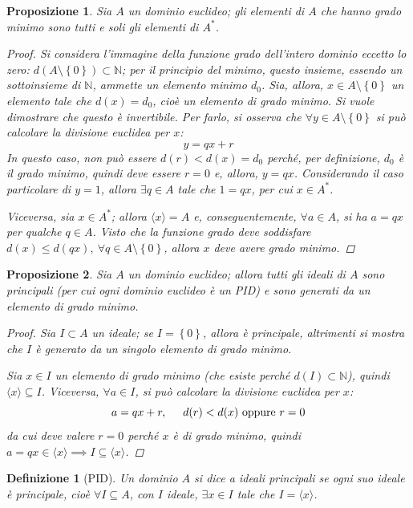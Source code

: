 \documentclass[12pt]{scrartcl}
\theoremstyle{style}
\newtheorem{definizione}{Definizione}[section]
\newtheorem{prop}{Proposizione}[section]
\numberwithin{equation}{subsection}
\begin{document}
\begin{prop}
	Sia $A$ un dominio euclideo; gli elementi di $A$ che hanno grado minimo sono tutti e soli gli elementi di $A^*$.
	\begin{proof}
		Si considera l'immagine della funzione grado dell'intero dominio eccetto lo zero: $d ( A\setminus\left\{ 0 \right\} ) \subset \mathbb{N}$; per il principio del minimo, questo insieme, essendo un sottoinsieme di $\mathbb{N}$, ammette un elemento minimo $d_0$.
		Sia, allora, $x \in A\setminus\left\{ 0 \right\} $ un elemento tale che $d(x) = d_0$, cio\`e un elemento di grado minimo. 
		Si vuole dimostrare che questo \`e invertibile.
		Per farlo, si osserva che $\forall y \in A\setminus\left\{ 0 \right\} $ si pu\`o calcolare la divisione euclidea per $x$:
		\[
		 y = qx +r
		\] 
		In questo caso, non pu\`o essere $d(r) < d(x) = d_0$ perch\'e, per definizione, $d_0$ \`e il grado minimo, quindi deve essere $r= 0$ e, allora, $y= qx$.
		Considerando il caso particolare di $y = 1$, allora $\exists q \in A$ tale che $1 = qx$, per cui $x \in A^*$.

		Viceversa, sia $x \in A^*$; allora $\langle x \rangle = A$ e, conseguentemente, $\forall a \in A$, si ha $a=qx$ per qualche $ q \in A$.
		Visto che la funzione grado deve soddisfare $d(x) \le d(qx), \ \forall q \in A \setminus\left\{ 0 \right\} $, allora $x$ deve avere grado minimo.
	\end{proof}
\end{prop}
\begin{prop}
	Sia $A$ un dominio euclideo; allora tutti gli ideali di $A$ sono principali (per cui ogni dominio euclideo \`e un PID) e sono generati da un elemento di grado minimo.
	\begin{proof}
		Sia $I \subset A$ un ideale; se $I=\left\{ 0 \right\} $, allora \`e principale, altrimenti si mostra che $I$ \`e generato da un singolo elemento di grado minimo.

		Sia $x \in I$ un elemento di grado minimo (che esiste perch\'e $d(I) \subset \mathbb{N}$), quindi $\langle x \rangle\subseteq I$.
		Viceversa, $\forall a \in I$, si pu\`o calcolare la divisione euclidea per $x$:
		\[
		a = qx + r , \hspace{.5cm} d(r) < d(x) \text{ oppure } r=0
		\] 
		da cui deve valere $r=0$ perch\'e $x$ \`e di grado minimo, quindi $a=qx \in \langle x \rangle \implies I \subseteq \langle x \rangle$.
	\end{proof}
\end{prop}
\begin{definizione}
	[PID]
	Un dominio $A$ si dice \textit{a ideali principali} se ogni suo ideale \`e principale, cio\`e $\forall I \subseteq A$, con $I$ ideale, $\exists x \in I $ tale che $I = \langle x \rangle$.
\end{definizione}
\end{document}
